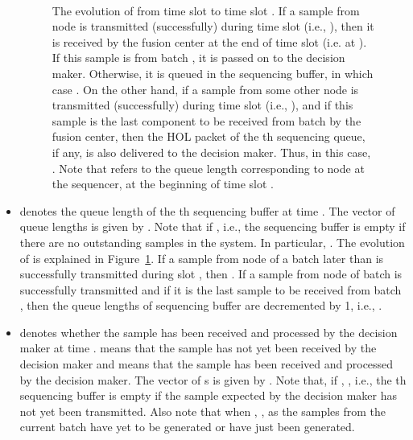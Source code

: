 \documentclass[acmtosn]{acmtrans2m}
\begin{document}
\begin{itemize}
      
\begin{figure}[t]
   \centering \
   \caption{The evolution of  from time slot  to time slot . 
            If a sample from node  is transmitted (successfully) during time 
            slot  (i.e., ), then it is received by the fusion center 
            at the end of time slot  (i.e. at ). If this sample is from
            batch , it is passed on to the decision maker. Otherwise, it is 
            queued in the sequencing buffer, in which case . 
            On the other hand, if a sample from some other node  is transmitted 
            (successfully) during time slot  (i.e., ), and if this 
            sample is the last component to be received from batch  by the fusion 
            center, then the HOL packet of the th sequencing queue, if any, is also 
            delivered to the decision maker. Thus, in this case, 
            . Note that  refers 
            to the queue length corresponding to node  at the sequencer, at the 
            beginning of time slot .}
   \label{fig:na_processing_embedding_fc_side}
\end{figure}

\item[]  denotes the queue 
     length of the th sequencing buffer at time . The vector of 
     queue lengths is given by . Note that  if , i.e., the sequencing buffer is empty if there are no 
     outstanding samples in the system. In particular, . The 
     evolution of  is explained in 
     Figure~\ref{fig:na_processing_embedding_fc_side}. If a sample from
     node  of a batch later than  is successfully transmitted
     during slot , then . If a sample from
     node  of batch  is successfully transmitted and if it is 
     the last sample to be received from batch , then the queue
     lengths of sequencing buffer are decremented by 1, i.e.,
     .   
     
\item[]  denotes whether the sample 
      has been received and processed by the decision 
     maker at time .  means that the sample 
      has not yet been received by the decision maker 
     and  means that the sample  has been 
     received and processed by the decision maker. The vector of 
     s is given by . Note that, if , , i.e., the th sequencing buffer is empty if the sample 
     expected by the decision maker has not yet been transmitted. Also 
     note that when , , as the 
     samples from the current batch  have yet to be generated or 
     have just been generated.        
\end{itemize}
\end{document}
